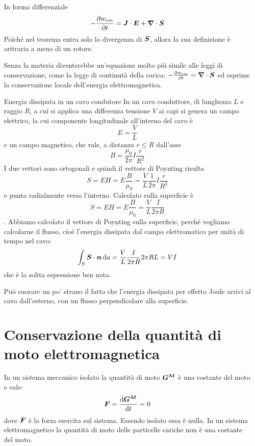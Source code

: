 In forma differenziale
\begin{equation}
  -\frac{\partial w_{em}}{\partial t}=\boldsymbol{J}\cdot \boldsymbol{E} + \boldsymbol{\nabla} \cdot \boldsymbol{S}
\end{equation}
Poiché nel teorema entra solo lo divergenza di $\boldsymbol{S}$, allora la sua definizione è aritraria a meno di un rotore.

Senza la materia diventerebbe un'equazione molto più simile alle leggi di conservazione, come la legge di continutà della carica: \(  -\frac{\partial w_{em}}{\partial t} = \boldsymbol{\nabla} \cdot \boldsymbol{S}\) ed esprime la conservazione locale dell'energia elettromagnetica.

\begin{Es}{Energia dissipata in un cavo condutore}
  In un cavo conduttore, di lunghezza $L$ e raggio $R$, a cui si applica una differenza tensione $V$ ai capi si genera un campo elettrico, la cui componente longitudinale all'interno del cavo è
  \[
    E = \frac{V}{L}
  \]
  e un campo magnetico, che vale, a distanza $r\leq R$ dall'asse
  \[
    B = \frac{\mu_0}{2\pi}I\frac{r}{R^2}
  \]
  I due vettori sono ortogonali e quindi il vettore di Poynting risulta
  \[
    S = EH = E \frac{B}{\mu_0} = \frac{V}{L}\frac{1}{2\pi}I\frac{r}{R^2}
  \]
  e punta radialmente verso l'interno. Calcolato sulla superficie è
  \[
    S = EH = E \frac{B}{\mu_0} = \frac{V}{L} \frac{I}{2\pi R}
  \]
  . Abbiamo calcolato il vettore di Poynting sulla superficie, perché vogliamo calcolarne il flusso, cioè l'energia dissipata dal campo elettromatico per unità di tempo nel cavo:
  \[
    \int_S \boldsymbol{S} \cdot \boldsymbol{n}\,\mathrm{d} a = \frac{V}{L} \frac{I}{2\pi R} 2\pi R L = V I
  \]
  che è la solita espressione ben nota.

  Può suorare un po' strano il fatto che l'energia dissipata per effetto Joule arrivi al cavo dall'esterno, con un flusso perpendicolare alla superficie.
\end{Es}


\section{Conservazione della quantità di moto elettromagnetica}
In un sistema meccanico isolato la quantità di moto $\boldsymbol{G^M}$ è una costante del moto e vale:
\begin{equation}
  \boldsymbol{F}=\frac{\mathrm{d} \boldsymbol{G^M}}{\mathrm{d} t}=0
\end{equation}
dove $\boldsymbol{F}$ è la forza esercita sul sistema. Essendo isolato essa è nulla. In un sistema elettromagnetico la quantità di moto delle particelle cariche non è una costante del moto.


